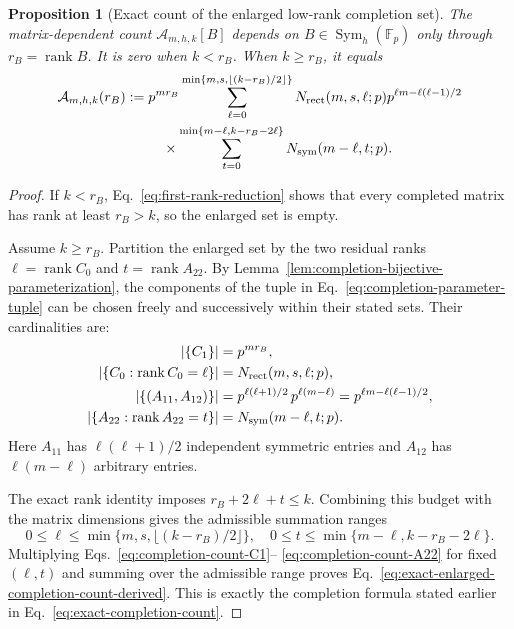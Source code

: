 \documentclass[11pt]{article}
\newcommand{\F}{\mathbb F}
\newcommand{\Sym}{\operatorname{Sym}}
\newcommand{\rank}{\operatorname{rank}}
\newcommand{\1}{\mathbf 1}
\theoremstyle{plain}
\newtheorem{proposition}[theorem]{Proposition}
\theoremstyle{definition}
\theoremstyle{remark}
\begin{document}
\begin{proposition}[Exact count of the enlarged low-rank completion set]
\label{prop:exact-ambient-completion-count}
The matrix-dependent count $\mathcal A_{m,h,k}[B]$ depends on
$B\in\Sym_h(\F_p)$ only through $r_B=\rank B$.  It is zero when
$k<r_B$.  When $k\ge r_B$, it equals
\begin{align}
 \mathcal A_{m,h,k}(r_B)
 :={}&p^{m r_B}
 \sum_{\ell=0}^{\min\{m,s,\lfloor(k-r_B)/2\rfloor\}}
 N_{\rm rect}(m,s,\ell;p)
 p^{\ell m-\ell(\ell-1)/2}\notag\\
 &\quad\times
 \sum_{t=0}^{\min\{m-\ell,k-r_B-2\ell\}}
 N_{\rm sym}(m-\ell,t;p).
 \label{eq:exact-enlarged-completion-count-derived}
\end{align}
\end{proposition}
\begin{proof}
If $k<r_B$, Eq.~\eqref{eq:first-rank-reduction} shows that every
completed matrix has rank at least $r_B>k$, so the enlarged set is
empty.

Assume $k\ge r_B$.  Partition the enlarged set by the two residual ranks
$\ell=\rank C_0$ and $t=\rank A_{22}$.  By
Lemma~\ref{lem:completion-bijective-parameterization}, the components of the
tuple in Eq.~\eqref{eq:completion-parameter-tuple} can be chosen freely and
successively within their stated sets.  Their cardinalities are:
\begin{align}
 |\{C_1\}|&=p^{m r_B},
 \label{eq:completion-count-C1}\\
 |\{C_0:\rank C_0=\ell\}|&=N_{\rm rect}(m,s,\ell;p),
 \label{eq:completion-count-C0}\\
 |\{(A_{11},A_{12})\}|
 &=p^{\ell(\ell+1)/2}\,p^{\ell(m-\ell)}
 =p^{\ell m-\ell(\ell-1)/2},
 \label{eq:completion-count-free-A-blocks}\\
 |\{A_{22}:\rank A_{22}=t\}|
 &=N_{\rm sym}(m-\ell,t;p).
 \label{eq:completion-count-A22}
\end{align}
Here $A_{11}$ has $\ell(\ell+1)/2$ independent symmetric entries and
$A_{12}$ has $\ell(m-\ell)$ arbitrary entries.

The exact rank identity imposes $r_B+2\ell+t\le k$.  Combining this budget
with the matrix dimensions gives the admissible summation ranges
\begin{equation}
 0\le\ell\le
 \min\{m,s,\lfloor(k-r_B)/2\rfloor\},
 \quad
 0\le t\le
 \min\{m-\ell,k-r_B-2\ell\}.
 \label{eq:completion-count-ranges}
\end{equation}
Multiplying Eqs.~\eqref{eq:completion-count-C1}--
\eqref{eq:completion-count-A22} for fixed $(\ell,t)$ and summing over the
admissible range proves
Eq.~\eqref{eq:exact-enlarged-completion-count-derived}.  This is exactly the
completion formula stated earlier in Eq.~\eqref{eq:exact-completion-count}.


\end{proof}
\end{document}
